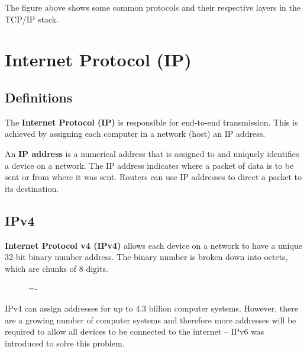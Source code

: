 \documentclass[a4paper]{systems-software}
\begin{document}
The figure above shows some common protocols and their respective layers in the TCP/IP stack.


\section*{Internet Protocol (IP)}

\subsection*{Definitions}

The \textbf{Internet Protocol (IP)} is responsible for end-to-end transmission. This is achieved by assigning each computer in a network (host) an IP address.

An \textbf{IP address} is a numerical address that is assigned to and uniquely identifies a device on a network. The IP address indicates where a packet of data is to be sent or from where it was sent. Routers can use IP addresses to direct a packet to its destination.


\subsection*{IPv4}

\textbf{Internet Protocol v4 (IPv4)} allows each device on a network to have a unique 32-bit binary number address. The binary number is broken down into octets, which are chunks of 8 digits.

\begin{figure}[H]
	\lineskip=-\fboxrule
\end{figure}

IPv4 can assign addresses for up to 4.3 billion computer systems. However, there are a growing number of computer systems and therefore more addresses will be required to allow all devices to be connected to the internet – IPv6 was introduced to solve this problem.
\end{document}
